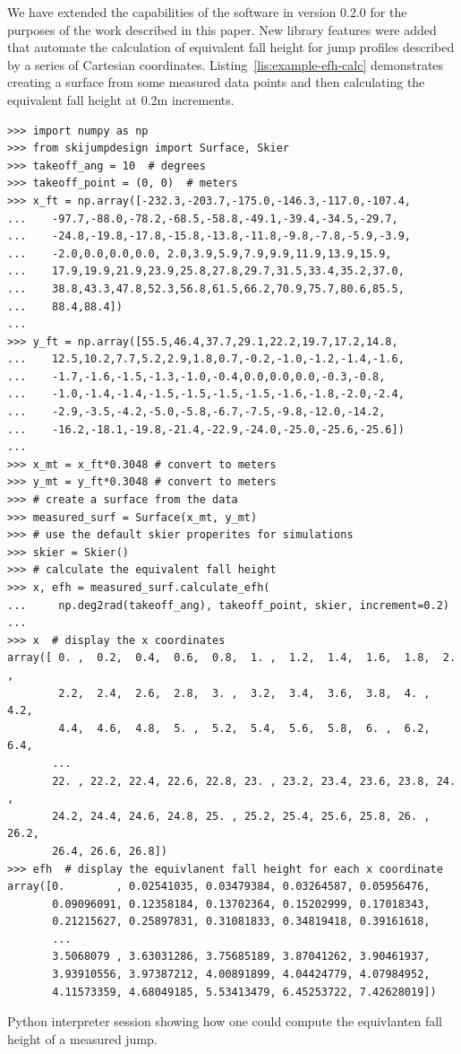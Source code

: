\documentclass{article}
\begin{document}
We have extended the capabilities of the software in version 0.2.0 for the
purposes of the work described in this paper. New library features were added
that automate the calculation of equivalent fall height for jump profiles
described by a series of Cartesian coordinates.
Listing~\ref{lis:example-efh-calc} demonstrates creating a surface from some
measured data points and then calculating the equivalent fall height at
0.2\si{\meter} increments.
%
\begin{listing*}
  \begin{verbatim}
>>> import numpy as np
>>> from skijumpdesign import Surface, Skier
>>> takeoff_ang = 10  # degrees
>>> takeoff_point = (0, 0)  # meters
>>> x_ft = np.array([-232.3,-203.7,-175.0,-146.3,-117.0,-107.4,
...    -97.7,-88.0,-78.2,-68.5,-58.8,-49.1,-39.4,-34.5,-29.7,
...    -24.8,-19.8,-17.8,-15.8,-13.8,-11.8,-9.8,-7.8,-5.9,-3.9,
...    -2.0,0.0,0.0,0.0, 2.0,3.9,5.9,7.9,9.9,11.9,13.9,15.9,
...    17.9,19.9,21.9,23.9,25.8,27.8,29.7,31.5,33.4,35.2,37.0,
...    38.8,43.3,47.8,52.3,56.8,61.5,66.2,70.9,75.7,80.6,85.5,
...    88.4,88.4])
...
>>> y_ft = np.array([55.5,46.4,37.7,29.1,22.2,19.7,17.2,14.8,
...    12.5,10.2,7.7,5.2,2.9,1.8,0.7,-0.2,-1.0,-1.2,-1.4,-1.6,
...    -1.7,-1.6,-1.5,-1.3,-1.0,-0.4,0.0,0.0,0.0,-0.3,-0.8,
...    -1.0,-1.4,-1.4,-1.5,-1.5,-1.5,-1.5,-1.6,-1.8,-2.0,-2.4,
...    -2.9,-3.5,-4.2,-5.0,-5.8,-6.7,-7.5,-9.8,-12.0,-14.2,
...    -16.2,-18.1,-19.8,-21.4,-22.9,-24.0,-25.0,-25.6,-25.6])
...
>>> x_mt = x_ft*0.3048 # convert to meters
>>> y_mt = y_ft*0.3048 # convert to meters
>>> # create a surface from the data
>>> measured_surf = Surface(x_mt, y_mt)
>>> # use the default skier properites for simulations
>>> skier = Skier()
>>> # calculate the equivalent fall height
>>> x, efh = measured_surf.calculate_efh(
...     np.deg2rad(takeoff_ang), takeoff_point, skier, increment=0.2)
...
>>> x  # display the x coordinates
array([ 0. ,  0.2,  0.4,  0.6,  0.8,  1. ,  1.2,  1.4,  1.6,  1.8,  2. ,
        2.2,  2.4,  2.6,  2.8,  3. ,  3.2,  3.4,  3.6,  3.8,  4. ,  4.2,
        4.4,  4.6,  4.8,  5. ,  5.2,  5.4,  5.6,  5.8,  6. ,  6.2,  6.4,
       ...
       22. , 22.2, 22.4, 22.6, 22.8, 23. , 23.2, 23.4, 23.6, 23.8, 24. ,
       24.2, 24.4, 24.6, 24.8, 25. , 25.2, 25.4, 25.6, 25.8, 26. , 26.2,
       26.4, 26.6, 26.8])
>>> efh  # display the equivlanent fall height for each x coordinate
array([0.        , 0.02541035, 0.03479384, 0.03264587, 0.05956476,
       0.09096091, 0.12358184, 0.13702364, 0.15202999, 0.17018343,
       0.21215627, 0.25897831, 0.31081833, 0.34819418, 0.39161618,
       ...
       3.5068079 , 3.63031286, 3.75685189, 3.87041262, 3.90461937,
       3.93910556, 3.97387212, 4.00891899, 4.04424779, 4.07984952,
       4.11573359, 4.68049185, 5.53413479, 6.45253722, 7.42628019])
  \end{verbatim}
  \caption{Python interpreter session showing how one could compute the
  equivlanten fall height of a measured jump.}
  \label{lis:example-efh-calc}
\end{listing*}
\end{document}
